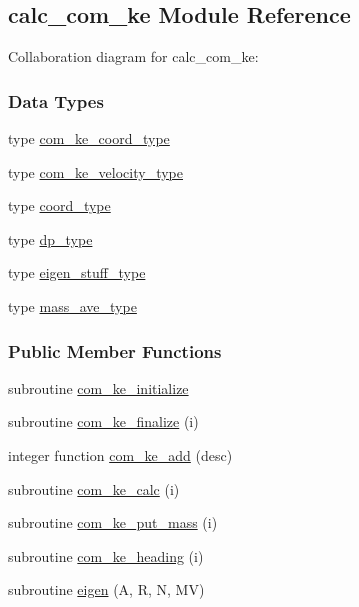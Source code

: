 \hypertarget{classcalc__com__ke}{\subsection{calc\-\_\-com\-\_\-ke Module Reference}
\label{classcalc__com__ke}
}


Collaboration diagram for calc\-\_\-com\-\_\-ke\-:
\subsubsection*{Data Types}
\begin{DoxyCompactItemize}
\item 
type \hyperlink{structcalc__com__ke_1_1com__ke__coord__type}{com\-\_\-ke\-\_\-coord\-\_\-type}
\item 
type \hyperlink{structcalc__com__ke_1_1com__ke__velocity__type}{com\-\_\-ke\-\_\-velocity\-\_\-type}
\item 
type \hyperlink{structcalc__com__ke_1_1coord__type}{coord\-\_\-type}
\item 
type \hyperlink{structcalc__com__ke_1_1dp__type}{dp\-\_\-type}
\item 
type \hyperlink{structcalc__com__ke_1_1eigen__stuff__type}{eigen\-\_\-stuff\-\_\-type}
\item 
type \hyperlink{structcalc__com__ke_1_1mass__ave__type}{mass\-\_\-ave\-\_\-type}
\end{DoxyCompactItemize}
\subsubsection*{Public Member Functions}
\begin{DoxyCompactItemize}
\item 
subroutine \hyperlink{classcalc__com__ke_abc5eddcd6ef58c3f77818ce4e55e32f2}{com\-\_\-ke\-\_\-initialize}
\item 
subroutine \hyperlink{classcalc__com__ke_a089d44e2e8eacfbd26da425a497530c5}{com\-\_\-ke\-\_\-finalize} (i)
\item 
integer function \hyperlink{classcalc__com__ke_a3c4a60a828ca4c037ffd87b608f6a8f7}{com\-\_\-ke\-\_\-add} (desc)
\item 
subroutine \hyperlink{classcalc__com__ke_a4721321fae51d63d7da0b33189366be2}{com\-\_\-ke\-\_\-calc} (i)
\item 
subroutine \hyperlink{classcalc__com__ke_adbdad96c615f5ba3734dbb189d877196}{com\-\_\-ke\-\_\-put\-\_\-mass} (i)
\item 
subroutine \hyperlink{classcalc__com__ke_a174b352e5b338775e20a4c1c0e547a35}{com\-\_\-ke\-\_\-heading} (i)
\item 
subroutine \hyperlink{classcalc__com__ke_a103eff9968044cf67aae4fcef67d0192}{eigen} (A, R, N, M\-V)
\end{DoxyCompactItemize}
